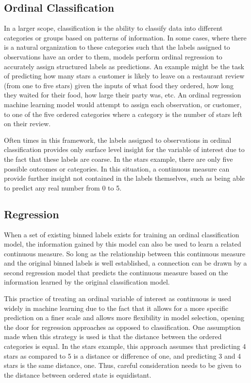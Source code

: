 \documentclass[10pt]{article}\usepackage[]{graphicx}\usepackage[]{xcolor}
\begin{document}
\subsection{Ordinal Classification}
In a larger scope, classification is the ability to classify data into different categories or groups based on patterns of information. In some cases, where there is a natural organization to these categories such that the labels assigned to observations have an order to them, models perform ordinal regression to accurately assign structured labels as predictions. An example might be the task of predicting how many stars a customer is likely to leave on a restaurant review (from one to five stars) given the inputs of what food they ordered, how long they waited for their food, how large their party was, etc. An ordinal regression machine learning model would attempt to assign each observation, or customer, to one of the five ordered categories where a category is the number of stars left on their review.

Often times in this framework, the labels assigned to observations in ordinal classification provides only surface level insight for the variable of interest due to the fact that these labels are coarse. In the stars example, there are only five possible outcomes or categories. In this situation, a continuous measure can provide further insight not contained in the labels themselves, such as being able to predict any real number from 0 to 5.

\subsection{Regression}
When a set of existing binned labels exists for training an ordinal classification model, the information gained by this model can also be used to learn a related continuous measure. So long as the relationship between this continuous measure and the original binned labels is well established, a connection can be drawn by a second regression model that predicts the continuous measure based on the information learned by the original classification model.

This practice of treating an ordinal variable of interest as continuous is used widely in machine learning due to the fact that it allows for a more specific prediction on a finer scale and allows more flexibility in model selection, opening the door for regression approaches as opposed to classification. One assumption made when this strategy is used is that the distance between the ordered categories is equal. In the stars example, this approach assumes that predicting 4 stars as compared to 5 is a distance or difference of one, and predicting 3 and 4 stars is the same distance, one. Thus, careful consideration needs to be given to the distance between ordered state is equidistant. 
\end{document}
